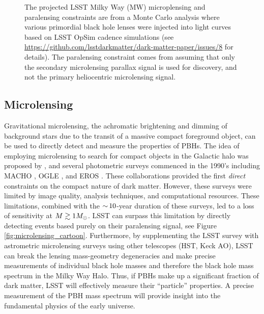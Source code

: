 \begin{figure}[t]
{    %
    The projected LSST Milky Way (MW) microplensing and paralensing constraints are from a Monte Carlo analysis where various primordial black hole lenses were injected into light curves based on LSST OpSim cadence simulations (see \url{https://github.com/lsstdarkmatter/dark-matter-paper/issues/8} for details).
    The paralensing constraint comes from assuming that only the secondary microlensing parallax signal is used for discovery, and not the primary heliocentric microlensing signal.
}
\end{figure}

\subsection{Microlensing}
\label{sec:microlensing}

Gravitational microlensing, the achromatic brightening and dimming of background stars due to the transit of a massive compact foreground object, can be used to directly detect and measure the properties of PBHs.
The idea of employing microlensing to search for compact objects in the Galactic halo was proposed by \citet{1986ApJ...304....1P}, and several photometric surveys commenced in the 1990's including MACHO \citep{1992ASPC...34..193A}, OGLE \citep{1992AcA....42..253U}, and EROS \citep{1993Msngr..72...20A}.
These collaborations provided the first \emph{direct} constraints on the compact nature of dark matter. 
However, these surveys were limited by image quality, analysis techniques, and computational resources.
These limitations, combined with the $ {\sim}\,10$-year duration of these surveys, led to a loss of sensitivity at $M \gtrsim 1 M_\odot$.
LSST can surpass this limitation by directly detecting events based purely on their paralensing signal, see Figure \ref{fig:microlensing_cartoon}.
Furthermore, by supplementing the LSST survey with astrometric microlensing surveys using other telescopes (HST, Keck AO), LSST can break the lensing mass-geometry degeneracies and make precise measurements of individual black hole masses and therefore the black hole mass spectrum in the Milky Way Halo.
Thus, if PBHs make up a significant fraction of dark matter, LSST will effectively measure their ``particle'' properties. 
A precise measurement of the PBH mass spectrum will provide insight into the fundamental physics of the early universe.

